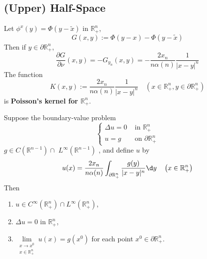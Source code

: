 \subsection{(Upper) Half-Space}
\begin{definition}
    Let $\phi^x(y)= \Phi (y-\tilde{x})$ in $\mathbb{R}_{+}^n$,
    \begin{equation*}
        G(x, y):=\Phi(y-x)-\Phi(y-\tilde{x})
    \end{equation*}
    Then if $y \in \partial \mathbb{R}_{+}^n$,
    \begin{equation*}
        \frac{\partial G}{\partial \nu}(x, y)=-G_{y_n}(x, y)=-\frac{2 x_n}{n \alpha(n)} \frac{1}{|x-y|^n}
    \end{equation*}
    The function
    \begin{equation*}
        K(x, y):=\frac{2 x_n}{n \alpha(n)} \frac{1}{|x-y|^n} \quad\left(x \in \mathbb{R}_{+}^n, y \in \partial \mathbb{R}_{+}^n\right)
    \end{equation*}
    is \textbf{Poisson's kernel for $\mathbb{R}_{+}^n$}.
\end{definition}
\begin{theorem}
    Suppose the boundary-value problem
    \begin{equation*}
        \left\{\begin{aligned}
            \Delta u=0 & \text { in } \mathbb{R}_{+}^n          \\
            u=g        & \text { on } \partial \mathbb{R}_{+}^n
        \end{aligned}\right.
    \end{equation*}
    $g \in C\left(\mathbb{R}^{n-1}\right) \cap$ $L^{\infty}\left(\mathbb{R}^{n-1}\right)$
    , and define $u$ by
    \begin{equation*}
        u(x)=\frac{2 x_n}{n \alpha(n)} \int_{\partial \mathbb{R}_{+}^n} \frac{g(y)}{|x-y|^n} \d y \quad\left(x \in \mathbb{R}_{+}^n\right)
    \end{equation*}
    Then
    \begin{enumerate}
        \item
              $u \in C^{\infty}\left(\mathbb{R}_{+}^n\right) \cap L^{\infty}\left(\mathbb{R}_{+}^n\right)$,

        \item
              $\Delta u=0$ in $\mathbb{R}_{+}^n$,

        \item
              $\lim\limits _{\substack{x \rightarrow x^0 \\ x \in \mathbb{R}_{+}^n}} u(x)=g\left(x^0\right)$ for each point $x^0 \in \partial \mathbb{R}_{+}^n$.
    \end{enumerate}
\end{theorem}

